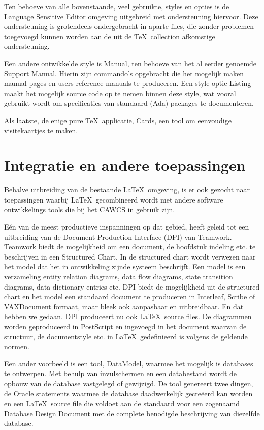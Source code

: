 Ten behoeve van alle bovenstaande, veel gebruikte, styles en opties is de
Language Sensitive Editor omgeving uitgebreid met ondersteuning hiervoor. Deze
ondersteuning is grotendeels ondergebracht in aparte files, die zonder problemen
toegevoegd kunnen worden aan de uit de \TeX\ collection afkomstige
ondersteuning.

Een andere ontwikkelde style is Manual, ten behoeve van het al eerder genoemde
Support Manual. Hierin zijn commando's opgebracht die het mogelijk maken manual
pages en users reference manuals te produceren. Een style optie Listing maakt
het mogelijk source code op te nemen binnen deze style, wat vooral gebruikt
wordt om specificaties van standaard (Ada) packages te documenteren.

Als laatste, de enige pure \TeX\ applicatie, Cards, een tool om eenvoudige
visitekaartjes te maken.

\section{Integratie en andere toepassingen}

Behalve uitbreiding van de bestaande \LaTeX\ omgeving, is er ook gezocht naar
toepassingen waarbij \LaTeX\ gecombineerd wordt met andere software
ontwikkelings tools die bij het CAWCS in gebruik zijn.

E\'en van de meest productieve inspanningen op dat gebied, heeft geleid tot een
uitbreiding van de Document Production Interface (DPI) van Teamwork. Teamwork
biedt de mogelijkheid om een document, de hoofdstuk indeling etc. te beschrijven
in een Structured Chart. In de structured chart wordt verwezen naar het model
dat het in ontwikkeling zijnde systeem beschrijft. Een model is een verzameling
entity relation diagrams, data flow diagrams, state transition diagrams, data
dictionary entries etc. DPI biedt de mogelijkheid uit de structured chart en het
model een standaard document te produceren in Interleaf, Scribe of VAXDocument
formaat, maar bleek ook aanpasbaar en uitbreidbaar. En dat hebben we gedaan. DPI
produceert nu ook \LaTeX\ source files. De diagrammen worden geproduceerd in
PostScript en ingevoegd in het document waarvan de structuur, de documentstyle
etc. in \LaTeX\ gedefinieerd is volgens de geldende normen.

Een ander voorbeeld is een tool, DataModel, waarmee het mogelijk is databases te
ontwerpen. Met behulp van invulschermen en een databestand wordt de opbouw van
de database vastgelegd of gewijzigd. De tool genereert twee dingen, de Oracle
statements waarmee de database daadwerkelijk gecre\"eerd kan worden en een
\LaTeX\ source file die voldoet aan de standaard voor een zogenaamd Database
Design Document met de complete benodigde beschrijving van diezelfde database.

